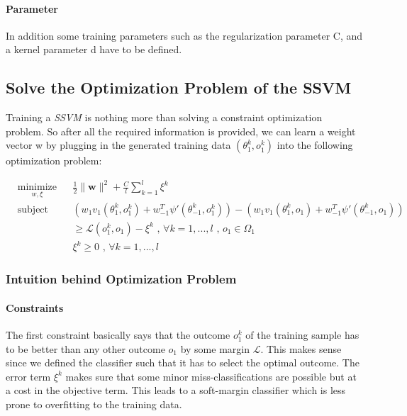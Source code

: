 \documentclass[]{article}
\begin{document}
\paragraph{Parameter} In addition some training parameters such as the regularization parameter C, and a kernel parameter d have to be defined.

\subsection{Solve the Optimization Problem of the SSVM}
Training a \emph{SSVM} is nothing more than solving a constraint optimization problem. So after all the required information is provided, we can learn a weight vector w by plugging in the generated training data $(\theta_{1}^{k}, o_{1}^{k})$ into the following optimization problem:

\begin{equation*}
\begin{aligned}
& \underset{w, \xi}{\text{minimize}}
& & \frac{1}{2} \lVert \mathbf{w} \rVert^{2} + \frac{C}{l} \sum_{k=1}^{l} \xi^{k}\\
& \text{subject to}
& & (w_{1}v_{1}(\theta_{1}^{k}, o_{1}^{k}) + w_{-1}^{T}\psi'(\theta_{-1}^{k},o_{1}^k)) -  (w_{1}v_{1}(\theta_{1}^{k},o_{1})+w_{-1}^{T}\psi'(\theta_{-1}^{k},o_{1})) \\ & & & 
\geq \mathcal{L}(o_{1}^{k},o_{1}) - \xi^{k}\text{ , } 	\forall k = 1,...,l \text{ , } o_{1} \in \Omega_{1} \\ & & &
\xi^{k} \geq 0 \text{ , } 	\forall k = 1,...,l
\end{aligned}
\end{equation*}

\subsubsection{Intuition behind Optimization Problem}

\paragraph{Constraints} The first constraint basically says that the outcome $o_{1}^{k}$ of the training sample has to be better than any other outcome $o_{1}$ by some margin $\mathcal{L}$. This makes sense since we defined the classifier such that it has to select the optimal outcome.
The error term $\xi^{k}$ makes sure that some minor miss-classifications are possible but at a cost in the objective term. This leads to a soft-margin classifier which is less prone to overfitting to the training data.
\end{document}
